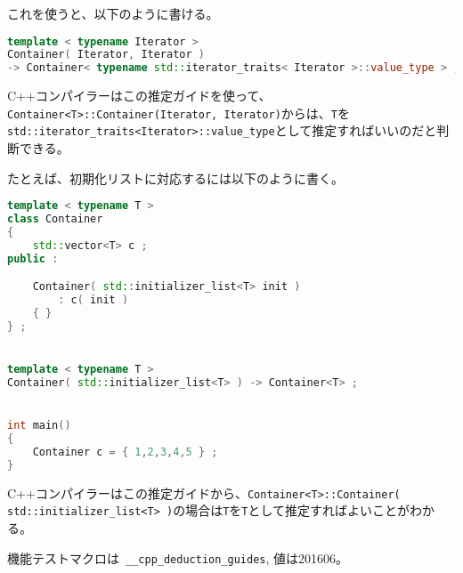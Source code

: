 これを使うと、以下のように書ける。

\begin{lstlisting}[language=C++]
template < typename Iterator >
Container( Iterator, Iterator )
-> Container< typename std::iterator_traits< Iterator >::value_type > ;
\end{lstlisting}

C++コンパイラーはこの推定ガイドを使って、\lstinline[breaklines=true]!Container<T>::Container(Iterator, Iterator)!からは、\lstinline!T!を\lstinline!std::iterator_traits<Iterator>::value_type!として推定すればいいのだと判断できる。

たとえば、初期化リストに対応するには以下のように書く。

\begin{lstlisting}[language=C++]
template < typename T >
class Container
{
    std::vector<T> c ;
public :

    Container( std::initializer_list<T> init )
        : c( init )
    { }
} ;


template < typename T >
Container( std::initializer_list<T> ) -> Container<T> ;


int main()
{
    Container c = { 1,2,3,4,5 } ;
}
\end{lstlisting}

C++コンパイラーはこの推定ガイドから、\lstinline[breaklines=true]!Container<T>::Container( std::initializer_list<T> )!の場合は\lstinline!T!を\lstinline!T!として推定すればよいことがわかる。

機能テストマクロは~\lstinline!__cpp_deduction_guides!, 値は201606。
